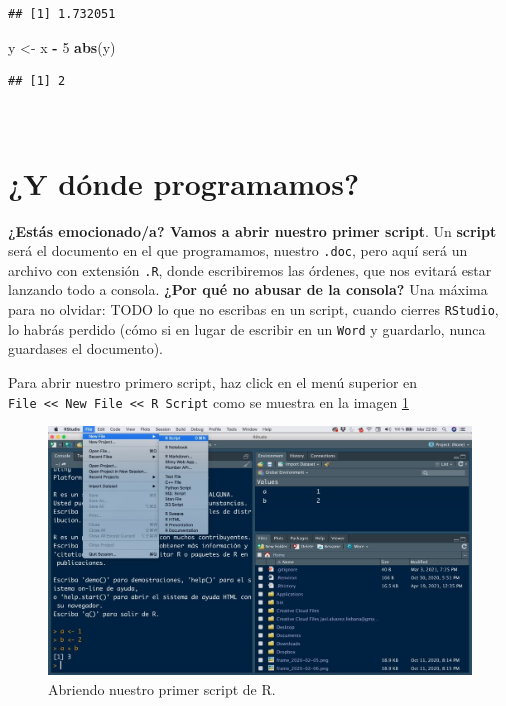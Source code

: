 \documentclass[11pt,]{book}
\newenvironment{Shaded}{\begin{snugshade}}{\end{snugshade}}
\newcommand{\DecValTok}[1]{\textcolor[rgb]{0.06,0.06,0.06}{#1}}
\newcommand{\KeywordTok}[1]{\textcolor[rgb]{0.27,0.27,0.27}{\textbf{#1}}}
\newcommand{\NormalTok}[1]{#1}
\newcommand{\OperatorTok}[1]{\textcolor[rgb]{0.43,0.43,0.43}{\textbf{#1}}}
\newcommand{\StringTok}[1]{\textcolor[rgb]{0.5,0.5,0.5}{#1}}
\begin{document}
\begin{verbatim}
## [1] 1.732051
\end{verbatim}

\begin{Shaded}
\begin{Highlighting}[]
\NormalTok{y <-}\StringTok{ }\NormalTok{x }\OperatorTok{-}\StringTok{ }\DecValTok{5}
\KeywordTok{abs}\NormalTok{(y)}
\end{Highlighting}
\end{Shaded}

\begin{verbatim}
## [1] 2
\end{verbatim}

~

\hypertarget{y-duxf3nde-programamos}{%
\section{¿Y dónde programamos?}\label{y-duxf3nde-programamos}}

\textbf{¿Estás emocionado/a? Vamos a abrir nuestro primer script}. Un \textbf{script} será el documento en el que programamos, nuestro \texttt{.doc}, pero aquí será un archivo con extensión \texttt{.R}, donde escribiremos las órdenes, que nos evitará estar lanzando todo a consola. \textbf{¿Por qué no abusar de la consola?} Una máxima para no olvidar: TODO lo que no escribas en un script, cuando cierres \texttt{RStudio}, lo habrás perdido (cómo si en lugar de escribir en un \texttt{Word} y guardarlo, nunca guardases el documento).

Para abrir nuestro primero script, haz click en el menú superior en \texttt{File\ \textless{}\textless{}\ New\ File\ \textless{}\textless{}\ R\ Script} como se muestra en la imagen \ref{fig:inicio-rstudio-5}

\begin{figure}

{\centering \includegraphics[width=0.8\linewidth]{./img/inicio_rstudio_5} 

}

\caption{Abriendo nuestro primer script de R.}\label{fig:inicio-rstudio-5}
\end{figure}
\end{document}
